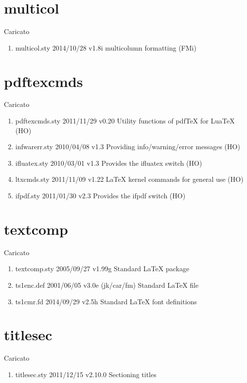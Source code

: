 \section{multicol}  

Caricato 
\begin{enumerate}
\item multicol.sty 2014/10/28 v1.8i multicolumn formatting (FMi)
\end{enumerate} 
\section{pdftexcmds}  

Caricato 
\begin{enumerate}
\item pdftexcmds.sty 2011/11/29 v0.20 Utility functions of pdfTeX for LuaTeX (HO)
\item infwarerr.sty 2010/04/08 v1.3 Providing info/warning/error messages (HO)
\item ifluatex.sty 2010/03/01 v1.3 Provides the ifluatex switch (HO)
\item ltxcmds.sty 2011/11/09 v1.22 LaTeX kernel commands for general use (HO)
\item ifpdf.sty 2011/01/30 v2.3 Provides the ifpdf switch (HO)
\end{enumerate} 
\section{textcomp}  

Caricato 
\begin{enumerate}
\item textcomp.sty 2005/09/27 v1.99g Standard LaTeX package
\item ts1enc.def 2001/06/05 v3.0e (jk/car/fm) Standard LaTeX file
\item ts1cmr.fd 2014/09/29 v2.5h Standard LaTeX font definitions
\end{enumerate} 
\section{titlesec}  

Caricato 
\begin{enumerate}
 \item titlesec.sty 2011/12/15 v2.10.0 Sectioning titles
\end{enumerate} 

